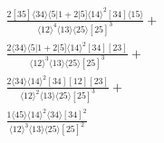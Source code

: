 \documentclass[varwidth, border=5pt]{standalone}
\begin{document}
\begin{my}
$\begin{gathered}
\scriptscriptstyle\frac{2[35]⟨34⟩⟨5|1+2|5]⟨14⟩^2[34]⟨15⟩}{⟨12⟩^4⟨13⟩⟨25⟩[25]^3}+\\
\scriptscriptstyle\frac{2⟨34⟩⟨5|1+2|5]⟨14⟩^2[34][23]}{⟨12⟩^3⟨13⟩⟨25⟩[25]^3}+\\
\scriptscriptstyle\frac{2⟨34⟩⟨14⟩^2[34][12][23]}{⟨12⟩^2⟨13⟩⟨25⟩[25]^3}+\\
\scriptscriptstyle\frac{1⟨45⟩⟨14⟩^2⟨34⟩[34]^2}{⟨12⟩^3⟨13⟩⟨25⟩[25]^2}\phantom{+}
\end{gathered}$
\end{my}
\end{document}
